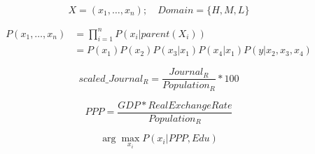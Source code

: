 \documentclass[a4paper]{article}
\begin{document}
\begin{equation}
  X = (x_1, \dotsc, x_n); \quad Domain = \{H, M, L\}
\end{equation}

\begin{align}
  P(x_{1}, \dotsc, x_{n}) &= \prod_{i=1}^n P(x_i|parent(X_i)) \\
  &= P(x_1) P(x_2) P(x_3|x_1) P(x_4|x_1) P(y|x_2, x_3, x_4)
\end{align}

\begin{equation}
  scaled\_Journal_R = \frac{Journal_R}{Population_R} * 100
\end{equation}

\begin{equation}
  PPP = \frac{GDP * RealExchangeRate}{Population_R}
\end{equation}

\begin{equation}
  \arg\max_{x_i} P(x_i|PPP,Edu)
\end{equation}
\end{document}
